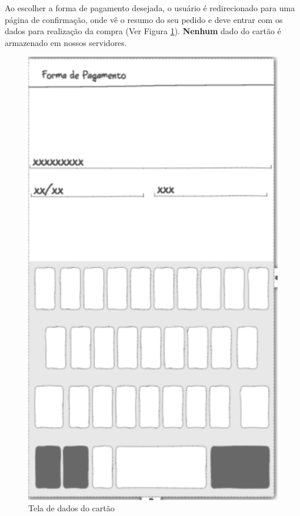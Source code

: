 \newpage

Ao escolher a forma de pagamento desejada, o usuário é redirecionado para uma página de confirmação, onde vê o resumo do seu pedido e deve entrar com os dados para realização da compra (Ver Figura \ref{fig:pagamento}). \textbf{Nenhum} dado do cartão é armazenado em nossos servidores.

\begin{figure}[h]
	\centering
    \includegraphics[scale=0.7]{figuras/pagamento}
	\caption{Tela de dados do cartão}
    \label{fig:pagamento}
\end{figure}

